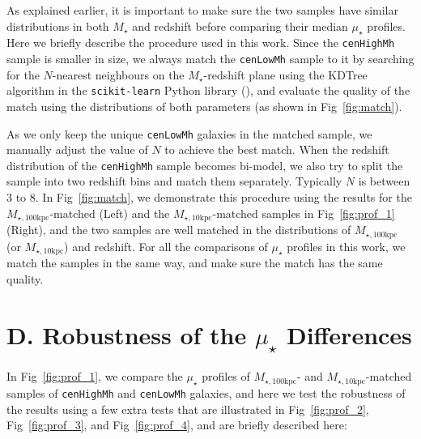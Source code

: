 \documentclass[a4paper,fleqn,usenatbib]{mnras}
\def\rbcg{\texttt{cenHighMh}}
\def\nbcg{\texttt{cenLowMh}}
\def\mstar{{$M_{\star}$}}
\def\minn{{$M_{\star,10\mathrm{kpc}}$}}
\def\mtot{{$M_{\star,100\mathrm{kpc}}$}}
\def\mden{{$\mu_{\star}$}}
\begin{document}
    As explained earlier, it is important to make sure the two samples have similar 
    distributions in both \mstar{} and redshift before comparing their median \mden{} 
    profiles.  
    Here we briefly describe the procedure used in this work. 
    Since the \rbcg{} sample is smaller in size, we always match the \nbcg{} sample to 
    it by searching for the $N$-nearest neighbours on the $M_{\star}$-redshift plane 
    using the KDTree algorithm in the \texttt{scikit-learn} Python library 
    (\citealt{scikit-learn}), and evaluate the quality of the match using the 
    distributions of both parameters (as shown in Fig~\ref{fig:match}). 
 
    As we only keep the unique \nbcg{} galaxies in the matched sample, we manually 
    adjust the value of $N$ to achieve the best match. 
    When the redshift distribution of the \rbcg{} sample becomes bi-model, we also try 
    to split the sample into two redshift bins and match them separately. 
    Typically $N$ is between 3 to 8.
    In Fig~\ref{fig:match}, we demonstrate this procedure using the results for 
    the \mtot{}-matched (Left) and the \minn{}-matched samples in Fig~\ref{fig:prof_1}
    (Right), and the two samples are well matched in the distributions of \mtot{}
    (or \minn{}) and redshift.  
    For all the comparisons of \mden{} profiles in this work, we match the samples 
    in the same way, and make sure the match has the same quality. 
    
\section{D. Robustness of the \mden{} Differences} 
	\label{app:robust}
    
    In Fig~\ref{fig:prof_1}, we compare the \mden{} profiles of \mtot{}- and 
    \minn{}-matched samples of \rbcg{} and \nbcg{} galaxies, and here we test the 
    robustness of the results using a few extra tests that are illustrated in
    Fig~\ref{fig:prof_2}, Fig~\ref{fig:prof_3}, and Fig~\ref{fig:prof_4}, and 
    are briefly described here:   
    
\end{document}
